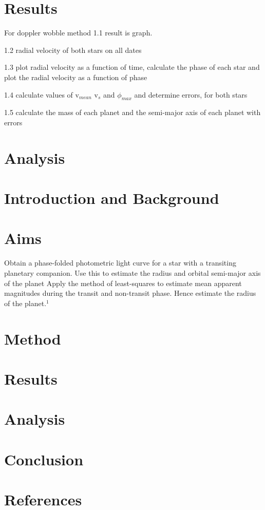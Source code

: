 \documentclass[]{article}
\begin{document}
\section*{Results}
For doppler wobble method 1.1 result is graph. \par
1.2 radial velocity of both stars on all dates\par
1.3 plot radial velocity as a function of time, calculate the phase
of each star and plot the radial velocity as a function of phase\par
1.4 calculate values of v$_{mean}$ v$_{s}$ and $\phi_{max}$ and determine errors,
for both stars\par
1.5 calculate the mass of each planet and the semi-major axis of each planet 
with errors\par



\section*{Analysis}





\newpage
\section*{Introduction and Background}

\section*{Aims}

Obtain a phase-folded photometric light curve for a star with a transiting 
planetary companion. Use this to estimate the radius and orbital semi-major 
axis of the planet
Apply the method of least-squares to estimate mean apparent magnitudes 
during the transit and non-transit phase. Hence estimate the radius of the planet.$^1$


\section*{Method}

\section*{Results}

\section*{Analysis}


\section*{Conclusion}

\section*{References}
\end{document}
